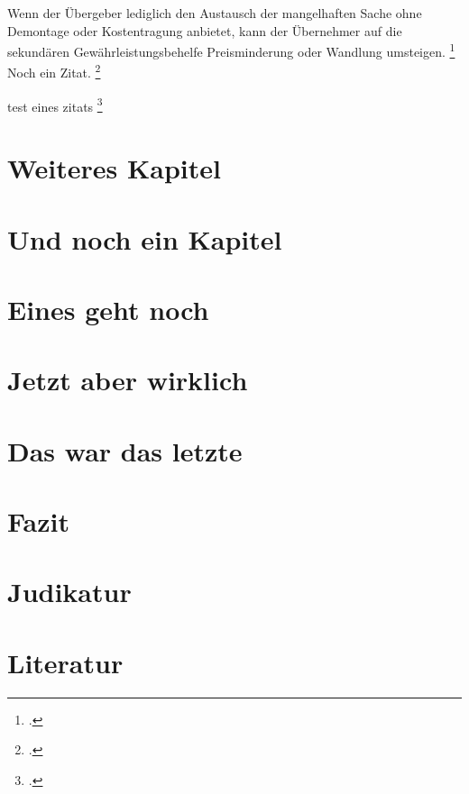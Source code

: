 \documentclass[a4paper, 12pt]{article}
\begin{document}
Wenn der Übergeber lediglich den Austausch der mangelhaften Sache ohne Demontage oder Kostentragung anbietet, kann der Übernehmer auf die sekundären Gewährleistungsbehelfe Preisminderung oder Wandlung umsteigen. \footcite[20]{sonnberger2023} Noch ein Zitat. \footcite[22]{sonnberger2023}

test eines zitats \footcite{vfgh2023}

\section{Weiteres Kapitel}

\section{Und noch ein Kapitel}

\section{Eines geht noch}

\section{Jetzt aber wirklich}

\section{Das war das letzte}

\section{Fazit}

\newpage

\section*{Judikatur}
\printbibliography[heading=none, type=jurisdiction]
\section*{Literatur}
\printbibliography[heading=none, nottype=jurisdiction]
\end{document}
